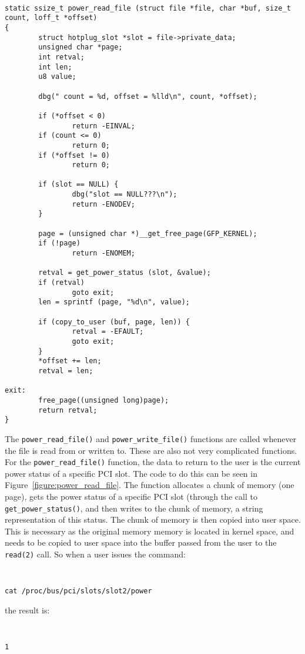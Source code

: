 \documentclass[twocolumn]{article}
\begin{document}
\begin{figure*}[tb]
{\tt \small
\begin{verbatim}
static ssize_t power_read_file (struct file *file, char *buf, size_t count, loff_t *offset)
{
        struct hotplug_slot *slot = file->private_data;
        unsigned char *page;
        int retval;
        int len;
        u8 value;

        dbg(" count = %d, offset = %lld\n", count, *offset);

        if (*offset < 0)
                return -EINVAL;
        if (count <= 0)
                return 0;
        if (*offset != 0)
                return 0;

        if (slot == NULL) {
                dbg("slot == NULL???\n");
                return -ENODEV;
        }

        page = (unsigned char *)__get_free_page(GFP_KERNEL);
        if (!page)
                return -ENOMEM;

        retval = get_power_status (slot, &value);
        if (retval)
                goto exit;
        len = sprintf (page, "%d\n", value);

        if (copy_to_user (buf, page, len)) {
                retval = -EFAULT;
                goto exit;
        }
        *offset += len;
        retval = len;

exit:
        free_page((unsigned long)page);
        return retval;
}
\end{verbatim}
}
\caption{\footnotesize{
{\tt power\_read\_file} from {\tt drivers/hotplug/pci\_hotplug\_core.c}}}
\label{figure:power_read_file}
\end{figure*}

The {\tt power\_read\_file()} and {\tt power\_write\_file()} functions are
called whenever the file is read from or written to.  These are also not
very complicated functions.  For the {\tt power\_read\_file()} function,
the data to return to the user is the current power status of a specific
PCI slot.  The code to do this can be seen in Figure~\ref{figure:power_read_file}.
The function allocates a chunk of memory (one page), gets the power status of
a specific PCI slot (through the call to {\tt get\_power\_status()}, and
then writes to the chunk of memory, a string representation of this status.
The chunk of memory is then copied into user space.  This is necessary as
the original memory memory is located in kernel space, and needs to be
copied to user space into the buffer passed from the user to the {\tt
read(2)} call.  So when a user issues the command:
{\tt \small
\begin{verbatim}
cat /proc/bus/pci/slots/slot2/power
\end{verbatim}
}
the result is:
{\tt \small
\begin{verbatim}
1
\end{verbatim}
}
\end{document}
